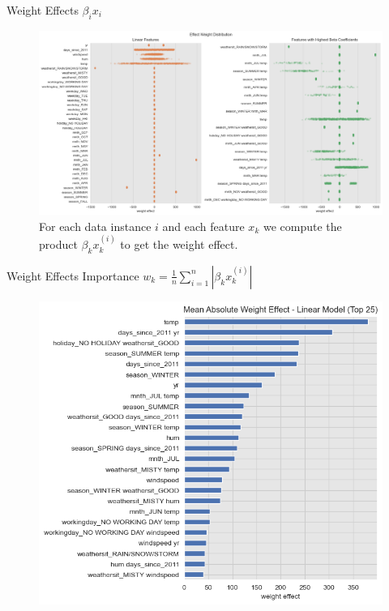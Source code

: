 \documentclass[10pt]{beamer}
\begin{document}
\begin{frame}{Weight Effects $\beta_{i}x_{i}$}
\begin{center}
  \begin{figure}
    \includegraphics[scale=0.3]{images/interpretable_ml_63_0.png}
    \caption{For each data instance $i$ and each feature $x_{k}$ we compute the product $\beta_{k}x^{(i)}_{k}$ to get the weight effect.}
  \end{figure}
\end{center}
\end{frame}

\begin{frame}{Weight Effects Importance $w_{k} = \frac{1}{n}\sum_{i=1}^{n}|\beta_{k}x_{k}^{(i)}|$}
\begin{center}
  \begin{figure}
    \includegraphics[scale=0.45]{images/interpretable_ml_64_0.png}
  \end{figure}
\end{center}
\end{frame}
\end{document}
